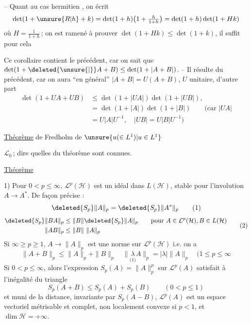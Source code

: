 -- Quant au cas hermitien , on écrit
\[
\det(1+\unsure{R|h}+k)=\det(1+h)\bigl(1+\tfrac{h}{1+h}\bigr)=\det(1+h)\det(1+Hk)
\]
où $H=\frac{1}{1+h}$\,; on est ramené à prouver
$\det(1+Hk)\leq\det(1+k)$, il suffit pour cela

Ce corollaire contient le précédent, car on sait
que $\det(1+\deleted{\unsure{|}}A+B)\leq\det(1+|A+B|)$. -- Il
résulte du précédent, car on aura ``en général''
$|A+B|=U(A+B)$, $U$ unitaire, d'autre part
\[
\begin{aligned}
\det(1+UA+UB)&\leq\det(1+|UA|)\det(1+|UB|),\\
&=\det(1+|A|)\det(1+|B|)\qquad(\text{car } |UA|\\
&=U|A|U^{-1},\quad |UB|=U|B|U^{-1})
\end{aligned}
\]

\uline{Théorème}  de Fredholm de $\unsure{u(\in L^1)|u\in L^1}$ 

 $\mathcal L_0$\,; dire   quelles
 du  théorème \unsure{--} sont connues.

\uline{Théorème}

1) Pour  $0<p\leq\infty$, $\mathcal L^p(\mathcal H)$ est un idéal 
dans $L(\mathcal H)$, stable pour l'involution $A\to A^*$. De
 façon précise :
\[
\deleted{S_p}\|A\|_p=\deleted{S_p}\|A^*\|_p \tag*{(1)}
\]
\[
\begin{aligned}
\deleted{S_p}\|BA\|_p&\leq\|B\|\deleted{S_p}\|A\|_p
\qquad\text{pour } A\in\mathcal L^p(\mathcal H),B\in L(\mathcal H)\\
\|AB\|_p&\leq\|B\|\ \|A\|_p
\end{aligned}\tag*{(2)}
\]
Si $\infty\geq p\geq1$, $A\to\|A\|_p$ est une norme sur $\mathcal L^p(\mathcal H)$ 
i.e. on a
\[
\|A+B\|_p\leq\|A\|_p+\|B\|_p\quad\|\underset{\text{(1)}}{\lambda} A\|_p=|\lambda|\|A\|_p
\quad(1\leq p\leq\infty\tag*{(3)}
\]
Si $0<p\leq\infty$, alors l'expression $S_p(A)=\|A\|_p^p$ sur
$\mathcal L^p(A)$ satisfait à l'inégalité du triangle
\[
S_p(A+B)\leq S_p(A)+S_p(B)\qquad(0<p\leq1)\tag*{(4)}
\]
et muni de la distance, invariante par 
$S_p(A-B)$, $\mathcal L^p(A)$ est un espace vectoriel 
métrisable et complet, non localement convexe
si $p<1$, et $\dim\mathcal H=+\infty$.

